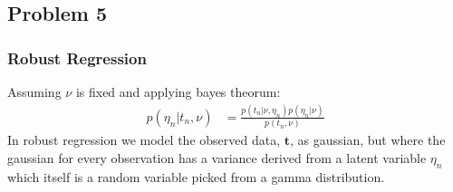 \documentclass[a4paper,12pt]{article}
\begin{document}
\subsection*{Problem 5}

\subsubsection*{Robust Regression}

Assuming $\nu$ is fixed and applying bayes theorum:
%
\begin{align*}
p( \eta_n | t_n, \nu ) &= \frac{p(t_n | \nu, \eta_n) p(\eta_n | \nu)}{p(t_n, \nu)}
\end{align*}
%
In robust regression we model the observed data, $\bm{t}$, as gaussian, but where the gaussian for every observation has a variance derived from a latent variable $\eta_n$ which itself is a random variable picked from a gamma distribution.
\end{document}
